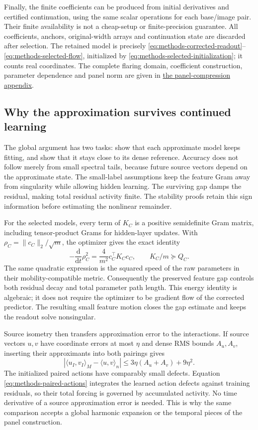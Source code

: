 Finally, the finite coefficients can be produced from initial derivatives
and certified continuation, using the same scalar operations for each
base/image pair. Their finite availability is not a cheap-setup or
finite-precision guarantee. All coefficients, anchors, original-width
arrays and continuation state are discarded after selection. The retained
model is precisely \eqref{eq:methods-corrected-readout}--\eqref{eq:methods-selected-flow},
initialized by \eqref{eq:methods-selected-initialization}; it counts real
coordinates. The complete flaring domain, coefficient construction,
parameter dependence and panel norm are given in
\hyperref[sec:panel-proof]{the panel-compression appendix}.

\subsection{Why the approximation survives continued learning}
\label{sec:compression-stability}

The global argument has two tasks: show that each approximate model keeps
fitting, and show that it stays close to its dense reference. Accuracy
does not follow merely from small spectral tails, because future source
vectors depend on the approximate state. The small-label assumptions keep
the feature Gram away from singularity while allowing hidden learning.
The surviving gap damps the residual, making total residual activity finite.
The stability proofs retain this sign information before estimating the
nonlinear remainder.

For the selected models, every term of $K_C$ is a positive semidefinite Gram matrix,
including tensor-product Grams for hidden-layer updates. With
$\rho_C=\|c_C\|_2/\sqrt m$, the optimizer gives the exact identity
\[
 -\frac{\mathrm d}{\mathrm dt}\rho_C^2
 =\frac4{m^2}c_C^\top K_Cc_C,\qquad K_C/m\succeq Q_C.
\]
The same quadratic expression is the squared speed of the raw parameters
in their mobility-compatible metric. Consequently the preserved feature
gap controls both residual decay and total parameter path length. This
energy identity is algebraic; it does not require the optimizer to be
gradient flow of the corrected predictor. The resulting small feature
motion closes the gap estimate and keeps the readout solve nonsingular.

Source isometry then transfers approximation error to the interactions.
If source vectors $u,v$ have coordinate errors at most $\eta$ and dense
RMS bounds $A_u,A_v$, inserting their approximants into both pairings gives
\[
 |\langle u_I,v_I\rangle_M-\langle u,v\rangle_n|
 \le3\eta(A_u+A_v)+9\eta^2.
\]
The initialized paired actions have comparably small defects. Equation
\eqref{eq:methods-paired-actions} integrates the learned action defects
against training residuals, so their total forcing is governed by
accumulated activity. No time derivative of a source approximation error
is needed. This is why the same comparison accepts a global harmonic
expansion or the temporal pieces of the panel construction.

